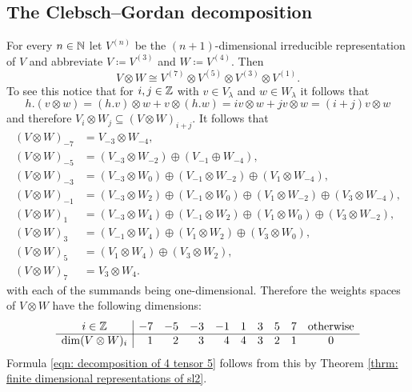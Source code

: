 \subsection{The Clebsch--Gordan decomposition}


\begin{expl}\label{expl: decomposition of the tensor product of 4 and 5}
 For every $n \in \mathbb{N}$ let $V^{(n)}$ be the $(n+1)$-dimensional irreducible representation of $V$ and abbreviate $V \coloneqq V^{(3)}$ and $W \coloneqq V^{(4)}$. Then
 \begin{equation}\label{eqn: decomposition of 4 tensor 5}
  V \otimes W \cong V^{(7)} \otimes V^{(5)} \otimes V^{(3)} \otimes V^{(1)}.
 \end{equation}
 To see this notice that for $i,j \in \mathbb{Z}$ with $v \in V_\lambda$ and $w \in W_\lambda$ it follows that
 \[
  h.(v \otimes w)
  = (h.v) \otimes w + v \otimes (h.w)
  = iv \otimes w + jv \otimes w
  = (i+j) v \otimes w
 \]
 and therefore $V_i \otimes W_j \subseteq (V \otimes W)_{i+j}$. It follows that
 \begin{align*}
  (V \otimes W)_{-7}
  &= V_{-3} \otimes W_{-4}, \\
  (V \otimes W)_{-5}
  &= (V_{-3} \otimes W_{-2}) \oplus (V_{-1} \oplus W_{-4}), \\
  (V \otimes W)_{-3}
  &= (V_{-3} \otimes W_0) \oplus (V_{-1} \otimes W_{-2}) \oplus (V_1 \otimes W_{-4}), \\
  (V \otimes W)_{-1}
  &= (V_{-3} \otimes W_2) \oplus (V_{-1} \otimes W_0) \oplus (V_1 \otimes W_{-2}) \oplus (V_3 \otimes W_{-4}), \\
  (V \otimes W)_1
  &= (V_{-3} \otimes W_4) \oplus (V_{-1} \otimes W_2) \oplus (V_1 \otimes W_0) \oplus (V_3 \otimes W_{-2}), \\
  (V \otimes W)_3
  &= (V_{-1} \otimes W_4) \oplus (V_1 \otimes W_2) \oplus (V_3 \otimes W_0), \\
  (V \otimes W)_5
  &= (V_1 \otimes W_4) \oplus (V_3 \otimes W_2), \\
  (V \otimes W)_7
  &= V_3 \otimes W_4.
 \end{align*}
 with each of the summands being one-dimensional. Therefore the weights spaces of $V \otimes W$ have the following dimensions:
 \[
  \begin{array}{c|rrrrrrrrc}
   i \in \mathbb{Z}             & -7 & -5 & -3 & -1 & 1 & 3 & 5 & 7 & \text{otherwise} \\
   \hline
   \dim (V \otimes W)_i &  1 &  2 &  3 &  4 & 4 & 3 & 2 & 1 & 0
  \end{array}
 \]
 Formula \eqref{eqn: decomposition of 4 tensor 5} follows from this by Theorem \ref{thrm: finite dimensional representations of sl2}.
\end{expl}


